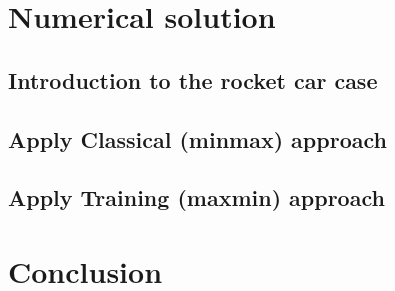 \documentclass  [
  paper    = a4,
  BCOR     = 10mm,
  twoside,
  fontsize = 12pt,
  fleqn,
  toc      = bibnumbered,
  toc      = listofnumbered,
  numbers  = noendperiod,
  headings = normal,
  listof   = leveldown,
  version  = 3.03
]                                       {scrreprt}
\newcommand{\<}{\langle}
\renewcommand{\>}{\rangle}
\begin{document}
\chapter{Numerical solution}
\label{Chapter4}
\section{Introduction to the rocket car case}

\section{Apply Classical (minmax) approach}


\section{Apply Training (maxmin) approach}

\chapter{Conclusion}
\label{Chapter5}

 
 












   
   
   
   
   
   
   
\end{document}

